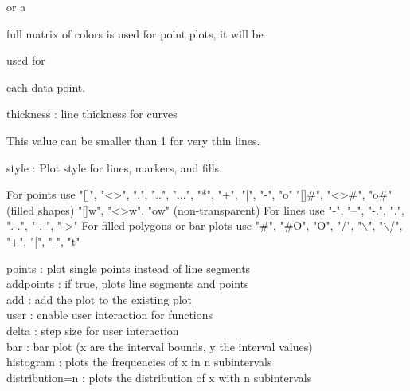 \documentclass[a4paper,10pt]{article}
\begin{document}
\begin{eulernotebook}
\begin{eulercomment}
\begin{eulercomment}
\begin{eulercomment}
\begin{eulercomment}
\begin{eulercomment}
\begin{eulercomment}
\begin{eulercomment}
\begin{eulercomment}
\begin{eulercomment}
or a\\
\end{eulercomment}
\begin{eulerttcomment}
            full matrix of colors is used for point plots, it will be
\end{eulerttcomment}
\begin{eulercomment}
used for\\
\end{eulercomment}
\begin{eulerttcomment}
            each data point.
\end{eulerttcomment}
\begin{eulercomment}
thickness : line thickness for curves\\
\end{eulercomment}
\begin{eulerttcomment}
            This value can be smaller than 1 for very thin lines.
\end{eulerttcomment}
\begin{eulercomment}
style     : Plot style for lines, markers, and fills.\\
\end{eulercomment}
\begin{eulerttcomment}
            For points use
            "[]", "<>", ".", "..", "...",
            "*", "+", "|", "-", "o"
            "[]#", "<>#", "o#" (filled shapes)
            "[]w", "<>w", "ow" (non-transparent)
            For lines use
            "-", "--", "-.", ".", ".-.", "-.-", "->"
            For filled polygons or bar plots use
            "#", "#O", "O", "/", "\(\backslash\)", "\(\backslash\)/",
            "+", "|", "-", "t"
\end{eulerttcomment}
\begin{eulercomment}
points    : plot single points instead of line segments\\
addpoints : if true, plots line segments and points\\
add       : add the plot to the existing plot\\
user      : enable user interaction for functions\\
delta     : step size for user interaction\\
bar       : bar plot (x are the interval bounds, y the interval
values)\\
histogram : plots the frequencies of x in n subintervals\\
distribution=n : plots the distribution of x with n subintervals\\

\end{eulercomment}
\end{eulercomment}
\end{eulercomment}
\end{eulercomment}
\end{eulercomment}
\end{eulercomment}
\end{eulercomment}
\end{eulercomment}
\end{eulercomment}
\end{eulernotebook}
\end{document}

